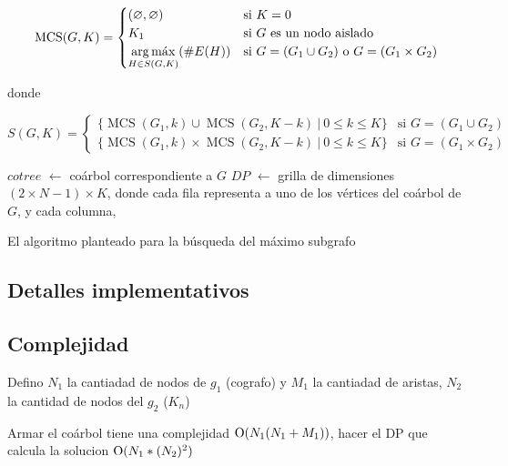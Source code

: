 \[
    \operatorname{MCS}(G, K) = \begin{cases}
        (\varnothing, \varnothing) & \text{si } K = 0 \\
        K_1 & \text{si } G \text{ es un nodo aislado} \\
        \displaystyle \argmax_{H \in S(G, K)}(\#E(H)) & \text{si } G = (G_1
        \cup G_2) \text{ o } G = (G_1 \times G_2) \\
    \end{cases}
\]

donde

\[
    S(G, K) = \begin{cases}
        \lbrace \operatorname{MCS}(G_1, k) \cup \operatorname{MCS}(G_2, K -
        k) \ \vert\ 0 \leq k \leq K \rbrace & \text{si } G = (G_1 \cup G_2) \\
        \lbrace \operatorname{MCS}(G_1, k) \times \operatorname{MCS}(G_2, K -
        k) \ \vert\ 0 \leq k \leq K \rbrace & \text{si } G = (G_1 \times G_2)
    \end{cases}
\]

\begin{algorithm}[H]

    $cotree$ $\gets$ coárbol correspondiente a $G$ \;
    $DP$ $\gets$ grilla de dimensiones $(2 \times N - 1) \times K$, donde \;
    cada fila representa a uno de los vértices del coárbol de $G$, y cada \;
    columna,
\end{algorithm}


El algoritmo planteado para la búsqueda del máximo subgrafo


\subsection{Detalles implementativos}

\subsection{Complejidad}
Defino $N_1$ la cantiadad de nodos de $g_1$ (cografo) y $M_1$ la cantiadad de aristas,
$N_2$ la cantidad de nodos del $g_2$ ($K_n$)

Armar el coárbol tiene una complejidad $\operatorname{O}(N_1(N_1 + M_1))$, hacer el DP que
calcula la solucion $\operatorname{O}(N_1 * (N_2)^2 )$

